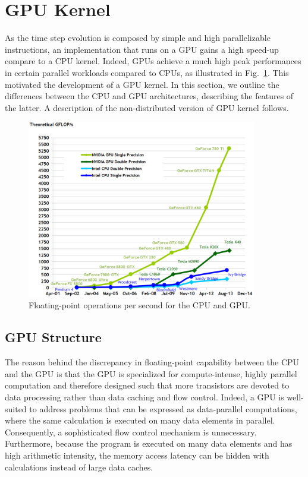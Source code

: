 \section{GPU Kernel}
As the time step evolution is composed by simple and high parallelizable instructions, an implementation that runs on a GPU gains a high speed-up compare to a CPU kernel. Indeed, GPUs achieve a much high peak performances in certain parallel workloads compared to CPUs, as illustrated in Fig.~\ref{fig:CPU-GPU-computational-power}. This motivated the development of a GPU kernel. In this section, we outline the differences between the CPU and GPU architectures, describing the features of the latter. A description of the non-distributed version of GPU kernel follows.
\begin{figure}
   \centering
   \includegraphics[width=10cm]{Figs/CPU-GPU_computational_power.eps}
   \caption{Floating-point operations per second for the CPU and GPU.} \label{fig:CPU-GPU-computational-power}
\end{figure}

\subsection{GPU Structure}
The reason behind the discrepancy in floating-point capability between the CPU and the GPU is that the GPU is specialized for compute-intense, highly parallel computation and therefore designed such that more transistors are devoted to data processing rather than data caching and flow control. Indeed, a GPU is well-suited to address problems that can be expressed as data-parallel computations, where the same calculation is executed on many data elements in parallel. Consequently,  a sophisticated flow control mechanism is unnecessary. Furthermore, because the program is executed on many data elements and has high arithmetic intensity, the memory access latency can be hidden with calculations instead of large data caches.

